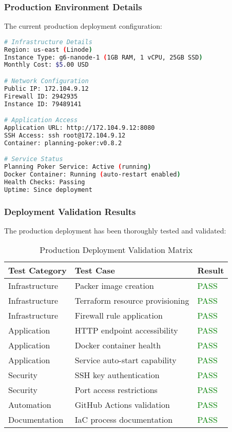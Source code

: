 \documentclass[11pt,a4paper]{article}
\begin{document}
\subsubsection{Production Environment Details}

The current production deployment configuration:

\begin{lstlisting}[language=bash, caption=Production Infrastructure Configuration]
# Infrastructure Details
Region: us-east (Linode)
Instance Type: g6-nanode-1 (1GB RAM, 1 vCPU, 25GB SSD)
Monthly Cost: $5.00 USD

# Network Configuration  
Public IP: 172.104.9.12
Firewall ID: 2942935
Instance ID: 79489141

# Application Access
Application URL: http://172.104.9.12:8080
SSH Access: ssh root@172.104.9.12
Container: planning-poker:v0.8.2

# Service Status
Planning Poker Service: Active (running)
Docker Container: Running (auto-restart enabled)
Health Checks: Passing
Uptime: Since deployment
\end{lstlisting}

\subsubsection{Deployment Validation Results}

The production deployment has been thoroughly tested and validated:

\begin{table}[H]
\centering
\begin{tabular}{@{}lll@{}}
\toprule
\textbf{Test Category} & \textbf{Test Case} & \textbf{Result} \\
\midrule
Infrastructure & Packer image creation & \textcolor{green}{PASS} \\
Infrastructure & Terraform resource provisioning & \textcolor{green}{PASS} \\
Infrastructure & Firewall rule application & \textcolor{green}{PASS} \\
Application & HTTP endpoint accessibility & \textcolor{green}{PASS} \\
Application & Docker container health & \textcolor{green}{PASS} \\
Application & Service auto-start capability & \textcolor{green}{PASS} \\
Security & SSH key authentication & \textcolor{green}{PASS} \\
Security & Port access restrictions & \textcolor{green}{PASS} \\
Automation & GitHub Actions validation & \textcolor{green}{PASS} \\
Documentation & IaC process documentation & \textcolor{green}{PASS} \\
\bottomrule
\end{tabular}
\caption{Production Deployment Validation Matrix}
\label{tab:deployment-validation}
\end{table}
\end{document}
